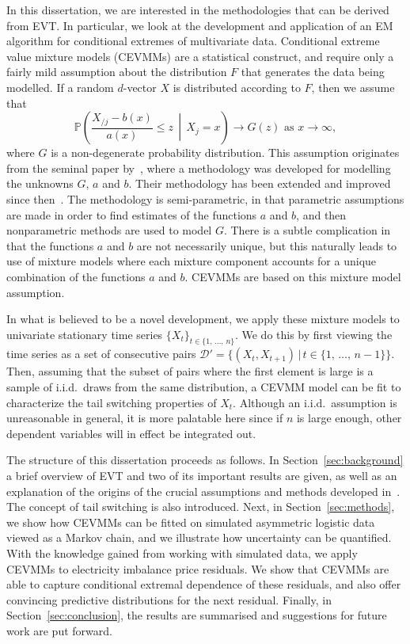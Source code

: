 \documentclass[11pt,twoside,openany]{book}
\newcommand{\prob}{\mathbb{P}}
\newcommand{\D}{\mathcal{D}}
\numberwithin{Theorem}{chapter}
\numberwithin{Definition}{chapter}
\numberwithin{Lemma}{chapter}
\numberwithin{Algorithm}{chapter}
\numberwithin{equation}{chapter}
\begin{document}
In this dissertation, we are interested in the methodologies that
can be derived from EVT. In particular, we look at the development and application of an EM
algorithm for conditional extremes  of multivariate
data. Conditional extreme value mixture models (CEVMMs) are a statistical construct, and
require only a fairly mild assumption about the distribution $F$ that generates
the data being modelled. If a random $d$-vector $X$ is
distributed according to $F$, then we assume that
\[
  \prob\left(\frac{X_{/j} - b(x)}{a(x)} \leq z\,\middle|\,X_j = x\right)\rightarrow G(z) \text{ as } x\rightarrow\infty,
\]
where $G$ is a non-degenerate probability distribution. This assumption
originates from the seminal paper by~\cite{heffernan2004conditional}, where a
methodology was developed for modelling the unknowns $G$, $a$ and $b$. Their
methodology has been extended and improved since
then~\citep{keef2013estimation}. The methodology is
semi-parametric, in that parametric assumptions are made in order to find
estimates of the functions $a$ and $b$, and then nonparametric methods are used
to model $G$. There is a subtle complication in that the functions
$a$ and $b$ are not necessarily unique, but this naturally leads to use
of mixture models where each mixture component accounts for a unique combination
of the functions $a$ and $b$. CEVMMs are based on this mixture model assumption.

In what is believed to be a novel development, we apply these mixture models to
univariate stationary time series $\{X_t\}_{t\in \{1,\,\ldots,\,n\}}$. We do
this by first viewing the time series as a set of consecutive pairs $\D' =
\{(X_{t},X_{t+1})\,|\,t\in\{1,\,\ldots,\,n-1\}\}$. Then, assuming that
the subset of pairs where the first element is large is a sample
of i.i.d.\ draws from the same distribution, a CEVMM model can be fit
to characterize the tail switching properties of $X_t$.
Although an i.i.d.\ assumption is unreasonable in general, it is more palatable
here since if $n$ is large enough, other dependent variables will in effect be
integrated out.

The structure of this dissertation proceeds as follows. In
Section~\ref{sec:background} a brief overview of EVT and two of
its important results are given,
as well as an explanation of the origins of the crucial
assumptions and methods developed in~\cite{heffernan2004conditional}. The
concept of tail switching is also introduced. Next, in Section~\ref{sec:methods}, we show how CEVMMs can be fitted
on simulated asymmetric logistic data viewed as a Markov chain, and we illustrate
how uncertainty can be quantified. With the knowledge gained from working with
simulated data, we apply CEVMMs to electricity imbalance price residuals.
We show that CEVMMs are able to capture conditional extremal dependence of these
residuals, and also offer convincing predictive distributions for
the next residual.
Finally, in Section~\ref{sec:conclusion}, the results are summarised and suggestions for future work are put forward.
\end{document}
